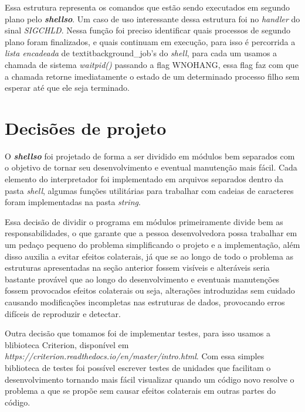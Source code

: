 \documentclass[a4paper, 12pt]{article}
\begin{document}
Essa estrutura representa os comandos que estão sendo executados em segundo plano pelo \textbf{\textit{shellso}}.
Um caso de uso interessante dessa estrutura foi no \textit{handler} do sinal \textit{SIGCHLD}.
Nessa função foi preciso identificar quais processos de segundo plano foram finalizados, e
quais continuam em execução, para isso é percorrida a \textit{lista encadeada} de 
textit{background\_job}'s do \textit{shell}, para cada um usamos a chamada de sistema 
\textit{waitpid()} passando a flag WNOHANG, essa flag faz com que a chamada
retorne imediatamente o estado de um determinado processo filho sem
esperar até que ele seja terminado.



\section{Decisões de projeto}

O \textbf{\textit{shellso}} foi projetado de forma a ser dividido em módulos bem separados
com o objetivo de tornar seu desenvolvimento e eventual manutenção mais fácil. Cada elemento
do interpretador foi implementado em arquivos separados dentro da pasta \textit{shell}, algumas
funções utilitárias para trabalhar com cadeias de caracteres foram implementadas na pasta \textit{string}.

Essa decisão de dividir o programa em módulos primeiramente divide bem as responsabilidades, 
o que garante que a pessoa desenvolvedora possa trabalhar em um pedaço pequeno do problema simplificando
o projeto e a implementação, além disso auxilia a evitar efeitos colaterais, já que se ao
longo de todo o problema as estruturas apresentadas na seção anterior fossem visíveis e 
alteráveis seria bastante provável que ao longo do desenvolvimento e eventuais manutenções
fossem provocados efeitos colaterais ou seja, alterações introduzidas sem cuidado
causando modificações incompletas nas estruturas de dados, provocando erros difíceis de reproduzir e detectar.

Outra decisão que tomamos foi de implementar testes, para isso usamos a blibioteca Criterion, disponível em 
\textit{https://criterion.readthedocs.io/en/master/intro.html}. Com essa simples biblioteca de testes 
foi possível escrever testes de unidades que facilitam o desenvolvimento tornando mais fácil
visualizar quando um código novo resolve o problema a que se propõe sem causar efeitos colaterais
em outras partes do código.
\end{document}
